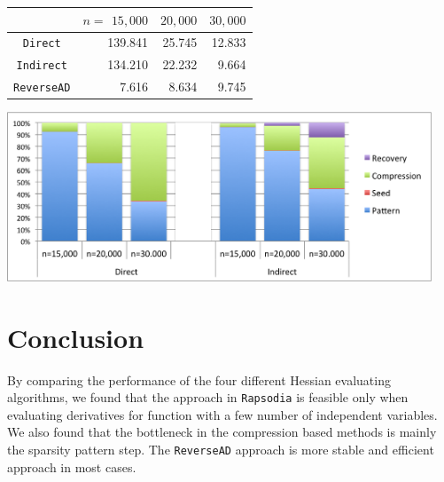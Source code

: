 \documentclass[11pt, a4paper, english]{article}
\begin{document}
\begin{minipage}{\textwidth}
  \begin{minipage}[b]{0.45\textwidth}
    \centering
\begin{tabular}{ | c | r | r | r |}
\hline
& $n=$ $15,000$ & $20,000$ & $30,000$\\
\hline
{\tt Direct} & 139.841 & 25.745 & 12.833\\
{\tt Indirect} & 134.210 & 22.232 & 9.664 \\
{\tt ReverseAD} & 7.616 & 8.634 & 9.745\\
\hline 
\end{tabular}
\vspace{0.3cm}
\end{minipage}
\begin{minipage}[b]{0.06\textwidth}
\phantom{b}
\end{minipage}
  \begin{minipage}[b]{0.45\textwidth}
    \centering
        \includegraphics[width=0.95\textwidth]{figures/pd}
  \end{minipage}
  \hfill
\end{minipage}
\section*{Conclusion}
By comparing the performance of the four different Hessian evaluating algorithms, we found that the approach in {\tt Rapsodia} is feasible only when evaluating derivatives for function with a few number of independent variables. We also found that the bottleneck in the compression based methods is mainly the sparsity pattern step. The {\tt ReverseAD} approach is more stable and efficient approach in most cases. 




\end{document}
